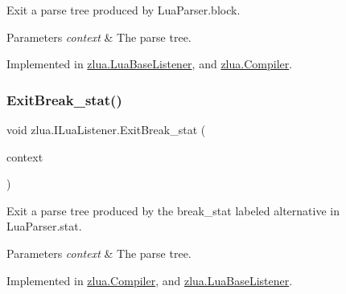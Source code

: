 Exit a parse tree produced by Lua\+Parser.\+block. 


\begin{DoxyParams}{Parameters}
{\em context} & The parse tree.\\
\hline
\end{DoxyParams}


Implemented in \mbox{\hyperlink{classzlua_1_1_lua_base_listener_a8d6e54dc1618ec3c8fdcc8ccea015a4f}{zlua.\+Lua\+Base\+Listener}}, and \mbox{\hyperlink{classzlua_1_1_compiler_a75376c8d84a2bb594e2fab53270000fb}{zlua.\+Compiler}}.

\mbox{\label{interfacezlua_1_1_i_lua_listener_a869e5a8abc4ddac071073a74bf09b6c5}} 
\subsubsection{\texorpdfstring{Exit\+Break\+\_\+stat()}{ExitBreak\_stat()}}
{\footnotesize\ttfamily void zlua.\+I\+Lua\+Listener.\+Exit\+Break\+\_\+stat (\begin{DoxyParamCaption}\item[{\mbox{[}\+Not\+Null\mbox{]} \mbox{\hyperlink{classzlua_1_1_lua_parser_1_1_break__stat_context}{Lua\+Parser.\+Break\+\_\+stat\+Context}}}]{context }\end{DoxyParamCaption})}



Exit a parse tree produced by the {\ttfamily break\+\_\+stat} labeled alternative in Lua\+Parser.\+stat. 


\begin{DoxyParams}{Parameters}
{\em context} & The parse tree.\\
\hline
\end{DoxyParams}


Implemented in \mbox{\hyperlink{classzlua_1_1_compiler_a6d60d0ca6f6c6c85d7ed31f0e7e8514d}{zlua.\+Compiler}}, and \mbox{\hyperlink{classzlua_1_1_lua_base_listener_ac0f699c3a181d8236218792a69955d0d}{zlua.\+Lua\+Base\+Listener}}.

\mbox{\label{interfacezlua_1_1_i_lua_listener_ae7d177d2d81dce7f3eca3f59aeef7732}} 
